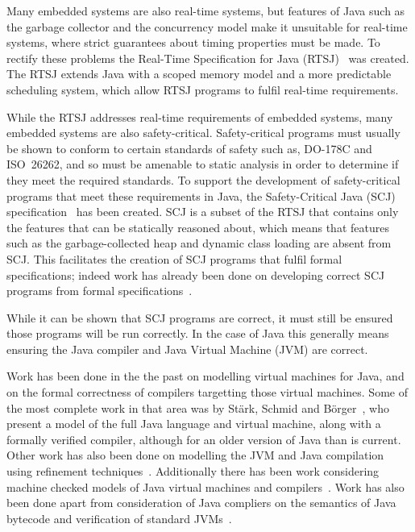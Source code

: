\documentclass[a4paper,12pt]{article}
\begin{document}
Many embedded systems are also real-time systems, but features of Java such as
the garbage collector and the concurrency model make it unsuitable for real-time
systems, where strict guarantees about timing properties must be made.  To
rectify these problems the Real-Time Specification for Java
(RTSJ)~\cite{gosling2000} was created.  The RTSJ extends Java with a scoped
memory model and a more predictable scheduling system, which allow RTSJ programs
to fulfil real-time requirements.

While the RTSJ addresses real-time requirements of embedded systems, many
embedded systems are also safety-critical.  Safety-critical programs must
usually be shown to conform to certain standards of safety such as,
\mbox{DO-178C} and ISO~26262, and so must be amenable to static analysis in
order to determine if they meet the required standards.  To support the
development of safety-critical programs that meet these requirements in Java,
the Safety-Critical Java (SCJ) specification~\cite{locke2013} has been created.
SCJ is a subset of the RTSJ that contains only the features that can be
statically reasoned about, which means that features such as the
garbage-collected heap and dynamic class loading are absent from SCJ.  This
facilitates the creation of SCJ programs that fulfil formal specifications;
indeed work has already been done on developing correct SCJ programs from formal
specifications~\cite{cavalcanti2011, cavalcanti2013}.

While it can be shown that SCJ programs are correct, it must still be ensured
those programs will be run correctly.  In the case of Java this generally means
ensuring the Java compiler and Java Virtual Machine (JVM) are correct. 

Work has been done in the the past on modelling virtual machines for Java, and
on the formal correctness of compilers targetting those virtual machines.  Some
of the most complete work in that area was by St\"{a}rk, Schmid and
B\"{o}rger~\cite{stark2001}, who present a model of the full Java language and
virtual machine, along with a formally verified compiler, although for an older
version of Java than is current.  Other work has also been done on modelling the
JVM and Java compilation using refinement
techniques~\cite{duran2010}. Additionally there has been work considering
machine checked models of Java virtual machines and
compilers~\cite{lochbihler2012, nipkow2000, strecker2002}. Work has also been
done apart from consideration of Java compliers on the semantics of Java
bytecode and verification of standard JVMs~\cite{bertelsen2000, jones1998}.
\end{document}
